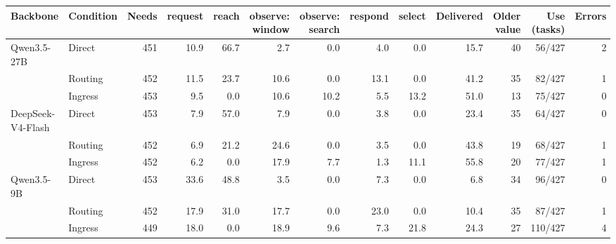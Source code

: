 \begin{tabular}{ll r rrrrrr r r r r}
\toprule
Backbone & Condition & Needs & request & reach & observe: window & observe: search & respond & select & Delivered & Older value & Use (tasks) & Errors \\
\midrule
Qwen3.5-27B & Direct & 451 & 10.9 & 66.7 & 2.7 & 0.0 & 4.0 & 0.0 & 15.7 & 40 & 56/427 & 2 \\
 & Routing & 452 & 11.5 & 23.7 & 10.6 & 0.0 & 13.1 & 0.0 & 41.2 & 35 & 82/427 & 1 \\
 & Ingress & 453 & 9.5 & 0.0 & 10.6 & 10.2 & 5.5 & 13.2 & 51.0 & 13 & 75/427 & 0 \\
\midrule
DeepSeek-V4-Flash & Direct & 453 & 7.9 & 57.0 & 7.9 & 0.0 & 3.8 & 0.0 & 23.4 & 35 & 64/427 & 0 \\
 & Routing & 452 & 6.9 & 21.2 & 24.6 & 0.0 & 3.5 & 0.0 & 43.8 & 19 & 68/427 & 1 \\
 & Ingress & 452 & 6.2 & 0.0 & 17.9 & 7.7 & 1.3 & 11.1 & 55.8 & 20 & 77/427 & 1 \\
\midrule
Qwen3.5-9B & Direct & 453 & 33.6 & 48.8 & 3.5 & 0.0 & 7.3 & 0.0 & 6.8 & 34 & 96/427 & 0 \\
 & Routing & 452 & 17.9 & 31.0 & 17.7 & 0.0 & 23.0 & 0.0 & 10.4 & 35 & 87/427 & 1 \\
 & Ingress & 449 & 18.0 & 0.0 & 18.9 & 9.6 & 7.3 & 21.8 & 24.3 & 27 & 110/427 & 4 \\
\bottomrule
\end{tabular}
